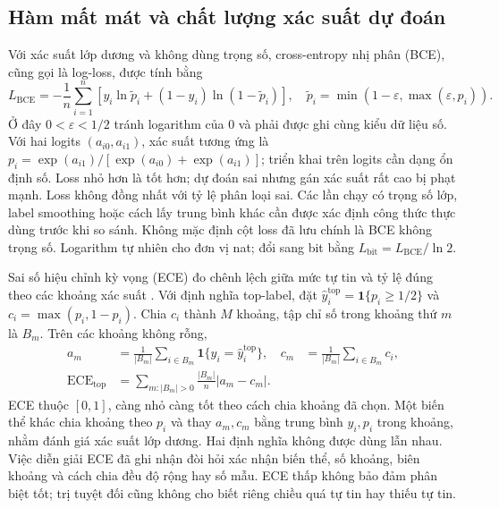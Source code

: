 \subsection{Hàm mất mát và chất lượng xác suất dự đoán}
Với xác suất lớp dương và không dùng trọng số, cross-entropy nhị phân
(BCE), cũng gọi là log-loss, được tính bằng \cite{sklearnLogLoss}
\begin{equation}
 L_{\mathrm{BCE}}=-\frac1n\sum_{i=1}^{n}
 \left[y_i\ln \widetilde p_i+(1-y_i)\ln(1-\widetilde p_i)\right],
 \quad \widetilde p_i=\min(1-\varepsilon,\max(\varepsilon,p_i)).
 \label{eq:metric-bce}
\end{equation}
Ở đây $0<\varepsilon<1/2$ tránh logarithm của 0 và phải được ghi cùng
kiểu dữ liệu số. Với hai logits $(a_{i0},a_{i1})$, xác suất tương ứng là
$p_i=\exp(a_{i1})/[\exp(a_{i0})+\exp(a_{i1})]$; triển khai trên logits
cần dạng ổn định số. Loss nhỏ hơn là tốt hơn; dự đoán sai nhưng gán xác
suất rất cao bị phạt mạnh. Loss không đồng nhất với tỷ lệ phân loại sai.
Các lần chạy có trọng số lớp, label smoothing hoặc cách lấy trung bình khác
cần được xác định công thức thực dùng trước khi so sánh. Không mặc định cột loss
đã lưu chính là BCE không trọng số. Logarithm tự nhiên cho đơn vị nat;
đổi sang bit bằng $L_{\mathrm{bit}}=L_{\mathrm{BCE}}/\ln2$.

Sai số hiệu chỉnh kỳ vọng (ECE) đo chênh lệch giữa mức tự tin và tỷ lệ
đúng theo các khoảng xác suất \cite{guo2017calibration}. Với định nghĩa
top-label, đặt $\widehat y_i^{\mathrm{top}}=\mathbf 1\{p_i\geq1/2\}$ và
$c_i=\max(p_i,1-p_i)$. Chia $c_i$ thành $M$ khoảng, tập chỉ số trong
khoảng thứ $m$ là $B_m$. Trên các khoảng không rỗng,
\begin{align}
 a_m&=\frac{1}{|B_m|}\sum_{i\in B_m}\mathbf 1\{y_i=\widehat y_i^{\mathrm{top}}\},&
 c_m&=\frac{1}{|B_m|}\sum_{i\in B_m}c_i,\\
 \mathrm{ECE}_{\mathrm{top}}&=\sum_{m:|B_m|>0}\frac{|B_m|}{n}|a_m-c_m|.
 \label{eq:metric-ece}
\end{align}
ECE thuộc $[0,1]$, càng nhỏ càng tốt theo cách chia khoảng đã chọn.
Một biến thể khác chia khoảng theo $p_i$ và thay $a_m,c_m$ bằng trung
bình $y_i,p_i$ trong khoảng, nhằm đánh giá xác suất lớp dương. Hai định
nghĩa không được dùng lẫn nhau. Việc diễn giải ECE đã ghi nhận đòi hỏi
xác nhận biến thể, số khoảng, biên khoảng và cách chia đều độ rộng hay số mẫu.
ECE thấp không bảo đảm phân biệt tốt; trị tuyệt đối cũng không cho biết
riêng chiều quá tự tin hay thiếu tự tin.

